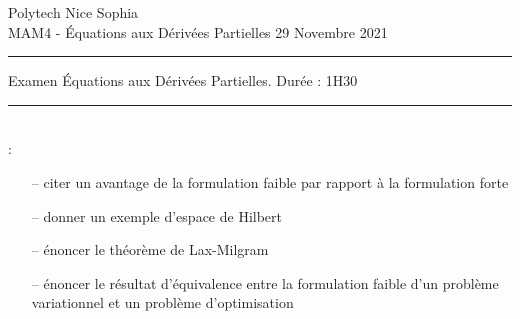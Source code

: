 \documentclass[12pt,a4paper]{article}
\begin{document}
 \hfill Polytech Nice Sophia\\
\noindent MAM4 - \'Equations aux D\'eriv\'ees Partielles \hfill 
29 Novembre 2021 \\

\hrule

\vspace{0.5cm}
\centerline {\large \sc Examen \'Equations aux D\'eriv\'ees Partielles. Dur\'ee : 1H30}
\vspace{0.5cm}


\hrule
\vspace{0.5cm}
\\

 :
\begin{itemize}
\item[--] citer un avantage de la formulation faible par rapport à la formulation forte
\item[--] donner un exemple d'espace de Hilbert
\item[--] \'enoncer le théorème de Lax-Milgram
\item[--] \'enoncer le résultat d'équivalence entre la formulation faible d'un problème variationnel et un problème d'optimisation
\end{itemize}
\end{document}
